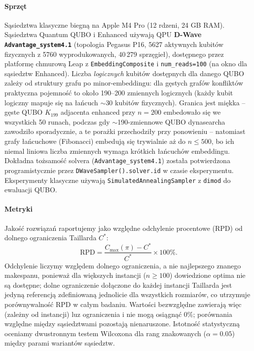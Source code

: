 \documentclass[11pt,a4paper]{article}
\begin{document}
\paragraph{Sprzęt}
Sąsiedztwa klasyczne biegną na Apple M4 Pro (12 rdzeni, 24 GB RAM).
Sąsiedztwa Quantum QUBO i Enhanced używają QPU \textbf{D-Wave
\texttt{Advantage\_system4.1}} (topologia Pegasus P16, 5627 aktywnych
kubitów fizycznych z 5760 wyprodukowanych, 40\,279 sprzęgieł),
dostępnego przez platformę chmurową Leap
z \texttt{EmbeddingComposite} i \texttt{num\_reads=100} (na okno dla
sąsiedztw Enhanced). Liczba \emph{logicznych} kubitów dostępnych dla
danego QUBO zależy od struktury grafu po minor-embeddingu: dla gęstych
grafów konfliktów praktyczna pojemność to około 190--200 zmiennych
logicznych (każdy kubit logiczny mapuje się na łańcuch $\sim$30
kubitów fizycznych). Granica jest miękka -- gęste QUBO $K_{199}$
adjacenta enhanced przy $n=200$ embedowało się we wszystkich 50
runach, podczas gdy $\sim$190-zmiennowe QUBO dynasearcha zawodziło
sporadycznie, a te porażki przechodziły przy ponowieniu -- natomiast
grafy łańcuchowe (Fibonacci) embedują się trywialnie aż do $n\le500$,
bo ich niemal liniowa liczba zmiennych wymaga krótkich łańcuchów
embeddingu. Dokładna tożsamość solvera (\texttt{Advantage\_system4.1})
została potwierdzona programistycznie przez
\texttt{DWaveSampler().solver.id} w czasie eksperymentu. Eksperymenty
klasyczne używają \texttt{SimulatedAnnealingSampler} z \texttt{dimod}
do ewaluacji QUBO.

\paragraph{Metryki}
Jakość rozwiązań raportujemy jako względne odchylenie procentowe (RPD)
od dolnego ograniczenia Taillarda $C^*$:
\begin{equation}
  \mathrm{RPD} = \frac{C_{\max}(\pi)-C^*}{C^*}\times100\%.
  \label{eq:rpd}
\end{equation}
Odchylenie liczymy względem dolnego ograniczenia, a nie najlepszego
znanego makespanu, ponieważ dla większych instancji ($n \geq 100$)
dowiedzione optima nie są dostępne; dolne ograniczenie dołączone do
każdej instancji Taillarda jest jedyną referencją zdefiniowaną
jednolicie dla wszystkich rozmiarów, co utrzymuje porównywalność RPD w
całym badaniu. Wartości bezwzględne zawierają więc (zależny od
instancji) luz ograniczenia i nie mogą osiągnąć $0\%$; porównania
względne między sąsiedztwami pozostają nienaruszone.
Istotność statystyczną oceniamy dwustronnym testem Wilcoxona dla rang
znakowanych ($\alpha=0.05$) między parami wariantów sąsiedztw.
\end{document}
